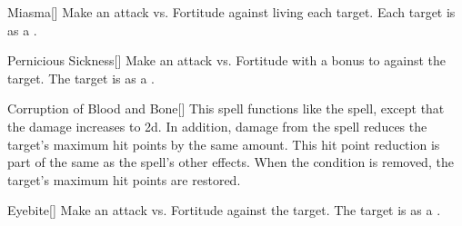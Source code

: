 \lowercase{\hypertarget{spell:Miasma}{}}\label{spell:Miasma}
\begin{freeability}[\nth{2}]{\hypertarget{spell:Miasma}{Miasma}}[]
Make an attack vs. Fortitude against living each target.
\hit Each target is  as a .
\end{freeability}
\vspace{0.25em}



\lowercase{\hypertarget{spell:Pernicious Sickness}{}}\label{spell:Pernicious Sickness}
\begin{freeability}[\nth{2}]{\hypertarget{spell:Pernicious Sickness}{Pernicious Sickness}}[]
Make an attack vs. Fortitude with a  bonus to  against the target.
\hit The target is  as a .
\end{freeability}
\vspace{0.25em}



\lowercase{\hypertarget{spell:Corruption of Blood and Bone}{}}\label{spell:Corruption of Blood and Bone}
\begin{freeability}[\nth{3}]{\hypertarget{spell:Corruption of Blood and Bone}{Corruption of Blood and Bone}}[]
This spell functions like the  spell, except that the damage increases to  \minus2d.
In addition, damage from the spell reduces the target's maximum hit points by the same amount.
This hit point reduction is part of the same  as the spell's other effects.
When the condition is removed, the target's maximum hit points are restored.
\end{freeability}
\vspace{0.25em}



\lowercase{\hypertarget{spell:Eyebite}{}}\label{spell:Eyebite}
\begin{freeability}[\nth{3}]{\hypertarget{spell:Eyebite}{Eyebite}}[]
Make an attack vs. Fortitude against the target.
\hit The target is  as a .
\end{freeability}
\vspace{0.25em}



